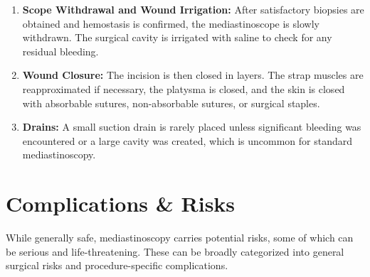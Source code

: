 \begin{enumerate}
  \item \textbf{Scope Withdrawal and Wound Irrigation:} After satisfactory biopsies are obtained and hemostasis is confirmed, the mediastinoscope is slowly withdrawn. The surgical cavity is irrigated with saline to check for any residual bleeding.
  \item \textbf{Wound Closure:} The incision is then closed in layers. The strap muscles are reapproximated if necessary, the platysma is closed, and the skin is closed with absorbable sutures, non-absorbable sutures, or surgical staples.
  \item \textbf{Drains:} A small suction drain is rarely placed unless significant bleeding was encountered or a large cavity was created, which is uncommon for standard mediastinoscopy.
\end{enumerate}

\section*{Complications \& Risks}
While generally safe, mediastinoscopy carries potential risks, some of which can be serious and life-threatening. These can be broadly categorized into general surgical risks and procedure-specific complications.

